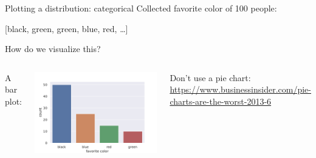 \documentclass[aspectratio=169,usenames,dvipsnames]{beamer}
\begin{document}
\begin{frame}{Plotting a distribution: categorical}
Collected favorite color of 100 people:

[black, green, green, blue, red, \dots ]

\vspace{1em}
How do we visualize this?

\pause\vspace{1em}
\begin{columns}
A bar plot:

\includegraphics[height=0.55\textheight]{fig/barplot}

Don't use a pie chart: \url{https://www.businessinsider.com/pie-charts-are-the-worst-2013-6}
\end{columns}
\end{frame}
\end{document}
